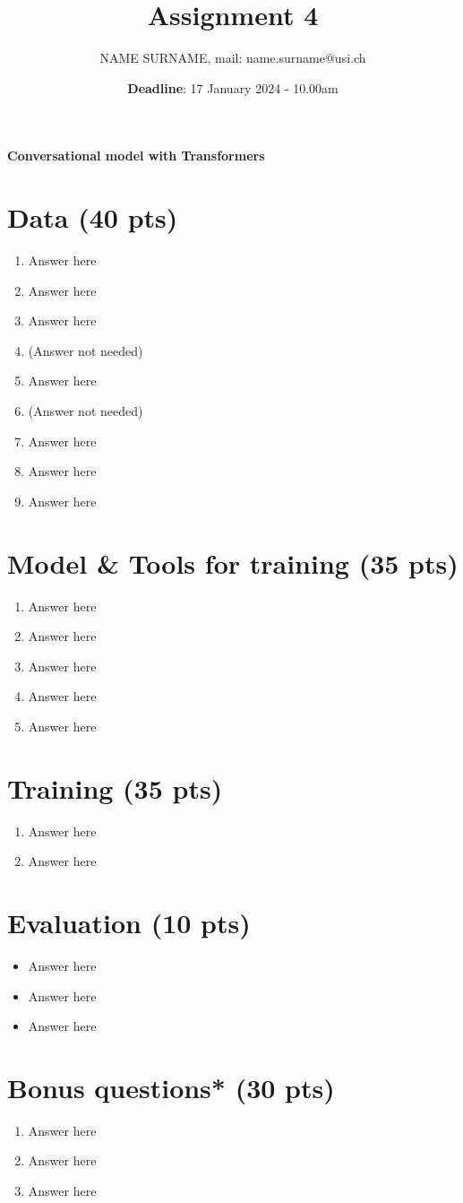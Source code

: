 \documentclass[a4paper]{article}
\title{Assignment 4}
\date{\textbf{Deadline}: 17 January 2024 - 10.00am}
\author{NAME SURNAME, mail: name.surname@usi.ch}
\begin{document}
\maketitle
 
\begin{center}
    \Large
    \textbf{Conversational model with Transformers}
\end{center}
 
\section{Data (40 pts)}
 
\begin{enumerate}
    \item Answer here
    \item Answer here
    \item Answer here
    \item (Answer not needed)
    \item Answer here
    \item (Answer not needed)
    \item Answer here
    \item Answer here
    \item Answer here
\end{enumerate}
 
\section{Model \& Tools for training (35 pts)}
\begin{enumerate}
    \item Answer here
    \item Answer here
    \item Answer here
    \item Answer here
    \item Answer here
\end{enumerate}
 
\section{Training (35 pts)}
\begin{enumerate}
\item Answer here
\item Answer here
\end{enumerate}
 
\section{Evaluation (10 pts)}
\begin{itemize}
    \item Answer here
    \item Answer here
    \item Answer here
\end{itemize}
 
 
\section{Bonus questions* (30 pts)}
\begin{enumerate}
    \item Answer here
    \item Answer here
    \item Answer here
\end{enumerate}
 
\end{document}
